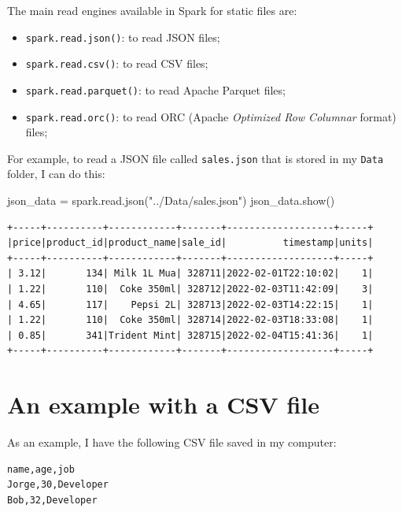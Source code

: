 \documentclass[
  11pt,
  letterpaper,
  DIV=11,
  numbers=noendperiod]{scrreprt}
\newenvironment{Shaded}{\begin{snugshade}}{\end{snugshade}}
\newcommand{\NormalTok}[1]{\textcolor[rgb]{0.00,0.23,0.31}{#1}}
\newcommand{\OperatorTok}[1]{\textcolor[rgb]{0.37,0.37,0.37}{#1}}
\newcommand{\StringTok}[1]{\textcolor[rgb]{0.13,0.47,0.30}{#1}}
\providecommand{\tightlist}{%
  \setlength{\itemsep}{0pt}\setlength{\parskip}{0pt}}\usepackage{longtable,booktabs,array}
\begin{document}
The main read engines available in Spark for static files are:

\begin{itemize}
\tightlist
\item
  \texttt{spark.read.json()}: to read JSON files;
\item
  \texttt{spark.read.csv()}: to read CSV files;
\item
  \texttt{spark.read.parquet()}: to read Apache Parquet files;
\item
  \texttt{spark.read.orc()}: to read ORC (Apache \emph{Optimized Row
  Columnar} format) files;
\end{itemize}

For example, to read a JSON file called \texttt{sales.json} that is
stored in my \texttt{Data} folder, I can do this:

\begin{Shaded}
\begin{Highlighting}[]
\NormalTok{json\_data }\OperatorTok{=}\NormalTok{ spark.read.json(}\StringTok{"../Data/sales.json"}\NormalTok{)}
\NormalTok{json\_data.show()}
\end{Highlighting}
\end{Shaded}

\begin{verbatim}
+-----+----------+------------+-------+-------------------+-----+
|price|product_id|product_name|sale_id|          timestamp|units|
+-----+----------+------------+-------+-------------------+-----+
| 3.12|       134| Milk 1L Mua| 328711|2022-02-01T22:10:02|    1|
| 1.22|       110|  Coke 350ml| 328712|2022-02-03T11:42:09|    3|
| 4.65|       117|    Pepsi 2L| 328713|2022-02-03T14:22:15|    1|
| 1.22|       110|  Coke 350ml| 328714|2022-02-03T18:33:08|    1|
| 0.85|       341|Trident Mint| 328715|2022-02-04T15:41:36|    1|
+-----+----------+------------+-------+-------------------+-----+
\end{verbatim}

\hypertarget{an-example-with-a-csv-file}{%
\section{An example with a CSV file}\label{an-example-with-a-csv-file}}

As an example, I have the following CSV file saved in my computer:

\begin{verbatim}
name,age,job
Jorge,30,Developer
Bob,32,Developer
\end{verbatim}
\end{document}
